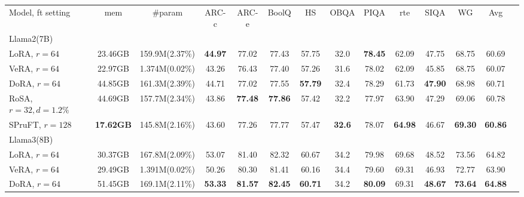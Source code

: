 \begin{table*}[htbp]
\tiny
\begin{center}
\begin{tabular}{lccccccccccccc}\toprule
Model, ft setting & mem & \#param & ARC-c & ARC-e & BoolQ & HS & OBQA & PIQA & rte & SIQA & WG & Avg
\\\cmidrule(lr){1-13}
Llama2(7B)\\ \cmidrule(lr){1-1} 
LoRA, $r=64$ & 23.46GB & 159.9M(2.37\%) & \textbf{44.97} & 77.02 & 77.43 & 57.75 & 32.0 & \textbf{78.45} & 62.09 & 47.75 & 68.75 & 60.69\\
VeRA, $r=64$ & 22.97GB & 1.374M(0.02\%) & 43.26 & 76.43 & 77.40 & 57.26 & 31.6 & 78.02 & 62.09 & 45.85 & 68.75 & 60.07\\
DoRA, $r=64$ & 44.85GB & 161.3M(2.39\%) & 44.71 & 77.02 & 77.55 & \textbf{57.79} & 32.4 & 78.29 & 61.73 & \textbf{47.90} & 68.98 & 60.71\\
RoSA, $r=32, d=1.2\%$ & 44.69GB & 157.7M(2.34\%) & 43.86 & \textbf{77.48} & \textbf{77.86} & 57.42 & 32.2 & 77.97 & 63.90 &  47.29 & 69.06 & 60.78\\
SPruFT, $r=128$ & \textbf{17.62GB} & 145.8M(2.16\%) & 43.60 & 77.26 & 77.77 & 57.47 & \textbf{32.6} & 78.07 & \textbf{64.98} & 46.67 & \textbf{69.30} & \textbf{60.86} %
\\\midrule
Llama3(8B)\\ \cmidrule(lr){1-1} 
LoRA, $r=64$ & 30.37GB & 167.8M(2.09\%) & 53.07 & 81.40 & 82.32 & 60.67 & 34.2 & 79.98 & 69.68 & 48.52 & 73.56 & 64.82\\
VeRA, $r=64$ & 29.49GB & 1.391M(0.02\%) & 50.26 & 80.30 & 81.41 & 60.16 & 34.4 & 79.60 & 69.31 & 46.93 & 72.77 & 63.90\\
DoRA, $r=64$ & 51.45GB & 169.1M(2.11\%) & \textbf{53.33} & \textbf{81.57} & \textbf{82.45} & \textbf{60.71} & 34.2 & \textbf{80.09} & 69.31 & \textbf{48.67} & \textbf{73.64} & \textbf{64.88}\\

\end{tabular}
\end{center}
\end{table*}
